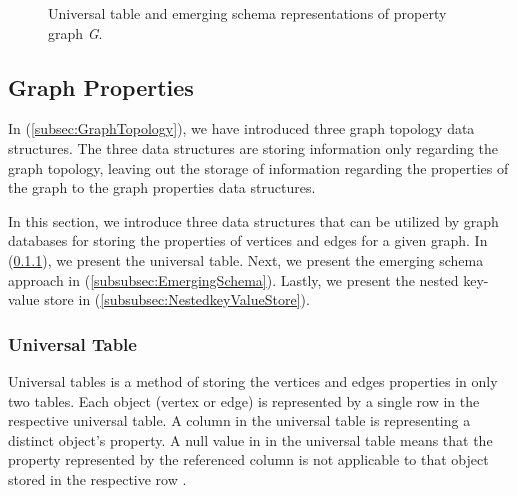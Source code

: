 {\begin{figure}[H]
{        \label{fig:VertexEmergingSchema}
    }
\centering
    \caption{Universal table and emerging schema representations of property graph \textit{G}.}
    \label{fig:GraphProperties_logical}
\end{figure}

\subsection{Graph Properties}
\label{subsec:GraphProperties}

In (\ref{subsec:GraphTopology}), we have introduced three graph topology data structures. The three data structures are storing information only regarding the graph topology, leaving out the storage of information regarding the properties of the graph to the graph properties data structures. 

In this section, we introduce three data structures that can be utilized by graph databases for storing the properties of vertices and edges for a given graph. In (\ref{subsubsec:UniversalTable}), we present the universal table. Next, we present the emerging schema approach in (\ref{subsubsec:EmergingSchema}). Lastly, we present the nested key-value store in (\ref{subsubsec:NestedkeyValueStore}).

\subsubsection{Universal Table}
\label{subsubsec:UniversalTable}

Universal tables is a method of storing the vertices and edges properties in only two tables. Each object (vertex or edge) is represented by a single row in the respective universal table. A column in the universal table is representing a distinct object's property. A null value in in the universal table means that the property represented by the referenced column is not applicable to that object stored in the respective row \cite{Paradies2017}.

}
